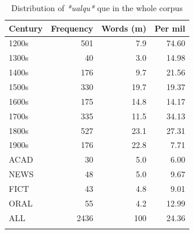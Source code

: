 \begin{table}
\begin{tabular}{lrrr}
\lsptoprule
Century &  Frequency &  Words (m) &  Per mil\\
\midrule
1200s& 501& 7.9& 74.60\\
1300s& 40& 3.0& 14.98\\
1400s& 176& 9.7& 21.56\\
1500s& 330& 19.7& 19.37\\
1600s& 175& 14.8& 14.17\\
1700s& 335& 11.5& 34.13\\
1800s& 527& 23.1& 27.31\\
1900s& 176& 22.8& 7.71\\
\tablevspace
ACAD& 30& 5.0& 6.00\\
NEWS& 48& 5.0& 9.67\\
FICT& 43& 4.8& 9.01\\
ORAL & 55& 4.2  & 12.99 \\
\midrule
ALL& 2436& 100& 24.36 \\
\lspbottomrule
\end{tabular}
\caption{Distribution of \textit{*ualqu*} que in the whole corpus}
\label{tab:extracted5}
\end{table}

